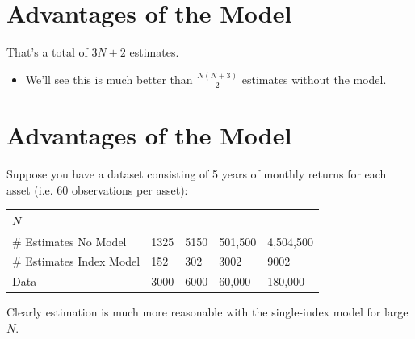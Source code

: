 \documentclass[letterpaper,10pt,english]{sphinxmanual}
\begin{document}
\section{Advantages of the Model}
\label{indexModels:id8}
That's a total of $3N+2$ estimates.
\begin{itemize}
\item {} 
We'll see this is much better than $\frac{N(N+3)}{2}$
estimates without the model.

\end{itemize}


\section{Advantages of the Model}
\label{indexModels:id9}
Suppose you have a dataset consisting of 5 years of monthly returns
for each asset (i.e. 60 observations per asset):

\begin{tabulary}{\linewidth}{|L|L|L|L|L|}
\hline
\textsf{\relax 
$N$
} & \textsf{
} & \textsf{
} & \textsf{
} & \textsf{
}\\
\hline
\# Estimates No Model
 & 
1325
 & 
5150
 & 
501,500
 & 
4,504,500
\\

\# Estimates Index Model
 & 
152
 & 
302
 & 
3002
 & 
9002
\\

Data
 & 
3000
 & 
6000
 & 
60,000
 & 
180,000
\\
\hline\end{tabulary}


Clearly estimation is much more reasonable with the single-index model
for large $N$.
\end{document}
